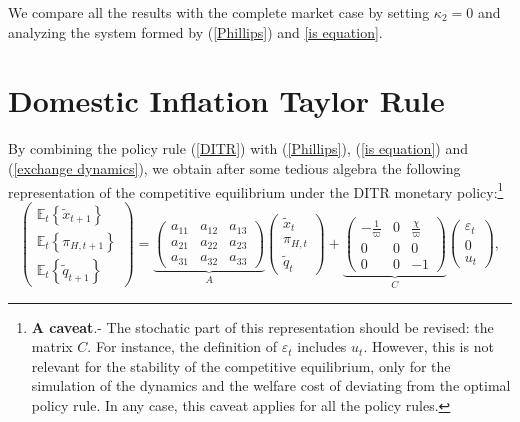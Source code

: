 \documentclass{article}
\begin{document}
We compare all the results with the complete market case by setting $\kappa
_{2}=0$ and analyzing the system formed by (\ref{Phillips}) and \ref{is
equation}.

\section{Domestic Inflation Taylor Rule}

By combining the policy rule (\ref{DITR}) with (\ref{Phillips}), (\ref{is
equation}) and (\ref{exchange dynamics}), we obtain after some tedious
algebra the following representation of the competitive equilibrium under
the DITR monetary policy:\footnote{\textbf{A caveat}.- The stochatic part of
this representation should be revised: the matrix $C.$ For instance, the
definition of $\varepsilon _{t}$ includes $u_{t}.$ However, this is not
relevant for the stability of the competitive equilibrium, only for the
simulation of the dynamics and the welfare cost of deviating from the
optimal policy rule. In any case, this caveat applies for all the policy
rules.}%
\begin{equation}
\left( 
\begin{array}{c}
\mathbb{E}_{t}\left\{ \widetilde{x}_{t+1}\right\} \\ 
\mathbb{E}_{t}\left\{ \pi _{H,t+1}\right\} \\ 
\mathbb{E}_{t}\left\{ \widetilde{q}_{t+1}\right\}%
\end{array}%
\right) =\underset{A}{\underbrace{\left( 
\begin{array}{ccc}
a_{11} & a_{12} & a_{13} \\ 
a_{21} & a_{22} & a_{23} \\ 
a_{31} & a_{32} & a_{33}%
\end{array}%
\right) }}\left( 
\begin{array}{c}
\widetilde{x}_{t} \\ 
\pi _{H,t} \\ 
\widetilde{q}_{t}%
\end{array}%
\right) +\underset{C}{\underbrace{\left( 
\begin{array}{ccc}
-\frac{1}{\varpi } & 0 & \frac{\chi }{\varpi } \\ 
0 & 0 & 0 \\ 
0 & 0 & -1%
\end{array}%
\right) }}\left( 
\begin{array}{c}
\varepsilon _{t} \\ 
0 \\ 
u_{t}%
\end{array}%
\right) ,  \label{DITR solution}
\end{equation}%
\end{document}
